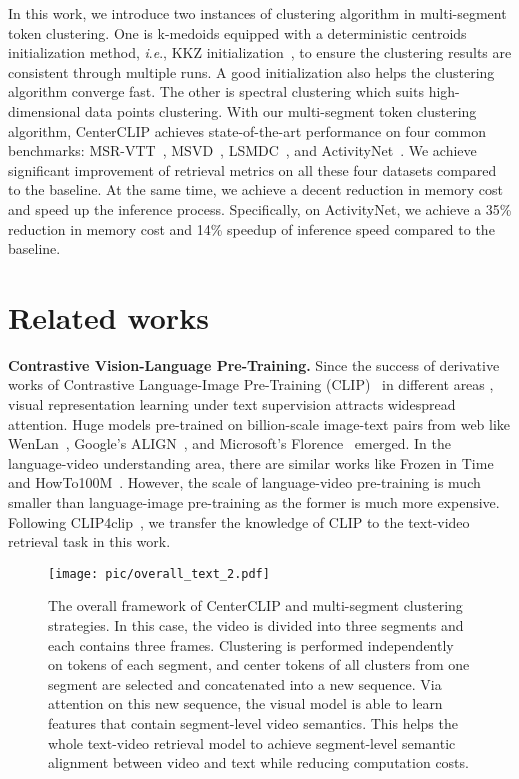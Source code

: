 \documentclass[sigconf]{acmart}
\newcommand{\ie}{\textit{i}.\textit{e}.}
\begin{document}
In this work, we introduce two instances of clustering algorithm
in multi-segment token clustering.
One is k-medoids equipped with a deterministic centroids initialization
method, \ie, KKZ initialization~\cite{1994_KKZ, DBLP:journals/ida/SuD07},
to ensure the clustering results are consistent through multiple runs.
A good initialization also helps the clustering algorithm converge fast.
The other is spectral clustering which suits high-dimensional 
data points clustering.
With our multi-segment token clustering
algorithm, CenterCLIP achieves state-of-the-art performance
on four common benchmarks:
MSR-VTT~\cite{xu2016msr},
MSVD~\cite{chen2011collecting},
LSMDC~\cite{rohrbach2015long},
and ActivityNet~\cite{caba2015activitynet}.
We achieve significant improvement of retrieval metrics on all these four datasets
compared to the baseline.
At the same time,
we achieve a decent reduction in memory cost
and speed up the inference process.
Specifically, on ActivityNet, we achieve a 35\% reduction in memory cost
and 14\% speedup of inference speed compared to the baseline.


\section{Related works}
\noindent\textbf{Contrastive Vision-Language Pre-Training.}
Since the success of derivative works
of Contrastive Language-Image
Pre-Training (CLIP)~\cite{2021-clip} in different areas
\cite{2021clip4clip, patashnik2021styleclip, bommasani2021opportunities,
shen2021much, xu2021videoclip},
visual representation learning under text supervision attracts
widespread attention.
Huge models pre-trained on billion-scale image-text pairs from web
like WenLan~\cite{huo2021wenlan},
Google's ALIGN~\cite{jia2021scaling}, and
Microsoft's Florence~\cite{yuan2021florence} emerged.
In the language-video understanding area,
there are similar works like
Frozen in Time~\cite{bain2021frozen} and HowTo100M~\cite{miech2019howto100m}.
However, the scale of language-video pre-training is much smaller than 
language-image pre-training as the former is much more expensive.
Following CLIP4clip~\cite{2021clip4clip},
we transfer the knowledge of CLIP to
the text-video retrieval task in this work.

\begin{figure*}[!t]
	\centering
	\texttt{[image: pic/overall\_text\_2.pdf]}
	\caption{The overall framework of CenterCLIP and multi-segment clustering strategies.
    In this case, the video is divided into three segments and each contains three frames.
    Clustering is performed independently on tokens of
    each segment, and center tokens of all clusters
    from one segment are selected and
    concatenated into a new sequence.
    Via attention on this new sequence,
	the visual model is able to learn features that contain segment-level video semantics.
	This helps the whole text-video retrieval model to 
	achieve segment-level semantic alignment between video 
	and text while reducing computation costs.  }
	\label{fig:overall}
\end{figure*}
\end{document}
